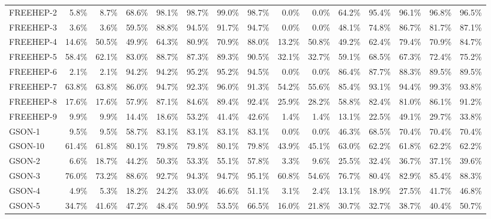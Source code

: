 \begin{tabular}{ l rrrrrrr rrrrrrr}
FREEHEP-2 &  5.8\% &  8.7\% &  68.6\% &  98.1\% &  98.7\% &  99.0\% &  98.7\% &  0.0\% &  0.0\% &  64.2\% &  95.4\% &  96.1\% &  96.8\% &  96.5\%\\ 
FREEHEP-3 &  3.6\% &  3.6\% &  59.5\% &  88.8\% &  94.5\% &  91.7\% &  94.7\% &  0.0\% &  0.0\% &  48.1\% &  74.8\% &  86.7\% &  81.7\% &  87.1\%\\ 
FREEHEP-4 &  14.6\% &  50.5\% &  49.9\% &  64.3\% &  80.9\% &  70.9\% &  88.0\% &  13.2\% &  50.8\% &  49.2\% &  62.4\% &  79.4\% &  70.9\% &  84.7\%\\ 
FREEHEP-5 &  58.4\% &  62.1\% &  83.0\% &  88.7\% &  87.3\% &  89.3\% &  90.5\% &  32.1\% &  32.7\% &  59.1\% &  68.5\% &  67.3\% &  72.4\% &  75.2\%\\ 
FREEHEP-6 &  2.1\% &  2.1\% &  94.2\% &  94.2\% &  95.2\% &  95.2\% &  94.5\% &  0.0\% &  0.0\% &  86.4\% &  87.7\% &  88.3\% &  89.5\% &  89.5\%\\ 
FREEHEP-7 &  63.8\% &  63.8\% &  86.0\% &  94.7\% &  92.3\% &  96.0\% &  91.3\% &  54.2\% &  55.6\% &  85.4\% &  93.1\% &  94.4\% &  99.3\% &  93.8\%\\ 
FREEHEP-8 &  17.6\% &  17.6\% &  57.9\% &  87.1\% &  84.6\% &  89.4\% &  92.4\% &  25.9\% &  28.2\% &  58.8\% &  82.4\% &  81.0\% &  86.1\% &  91.2\%\\ 
FREEHEP-9 &  9.9\% &  9.9\% &  14.4\% &  18.6\% &  53.2\% &  41.4\% &  42.6\% &  1.4\% &  1.4\% &  13.1\% &  22.5\% &  49.1\% &  29.7\% &  33.8\%\\ 
GSON-1 &  9.5\% &  9.5\% &  58.7\% &  83.1\% &  83.1\% &  83.1\% &  83.1\% &  0.0\% &  0.0\% &  46.3\% &  68.5\% &  70.4\% &  70.4\% &  70.4\%\\ 
GSON-10 &  61.4\% &  61.8\% &  80.1\% &  79.8\% &  79.8\% &  80.1\% &  79.8\% &  43.9\% &  45.1\% &  63.0\% &  62.2\% &  61.8\% &  62.2\% &  62.2\%\\ 
GSON-2 &  6.6\% &  18.7\% &  44.2\% &  50.3\% &  53.3\% &  55.1\% &  57.8\% &  3.3\% &  9.6\% &  25.5\% &  32.4\% &  36.7\% &  37.1\% &  39.6\%\\ 
GSON-3 &  76.0\% &  73.2\% &  88.6\% &  92.7\% &  94.3\% &  94.7\% &  95.1\% &  60.8\% &  54.6\% &  76.7\% &  80.4\% &  82.9\% &  85.4\% &  88.3\%\\ 
GSON-4 &  4.9\% &  5.3\% &  18.2\% &  24.2\% &  33.0\% &  46.6\% &  51.1\% &  3.1\% &  2.4\% &  13.1\% &  18.9\% &  27.5\% &  41.7\% &  46.8\%\\ 
GSON-5 &  34.7\% &  41.6\% &  47.2\% &  48.4\% &  50.9\% &  53.5\% &  66.5\% &  16.0\% &  21.8\% &  30.7\% &  32.7\% &  38.7\% &  40.4\% &  50.7\%\\ 

\end{tabular}
